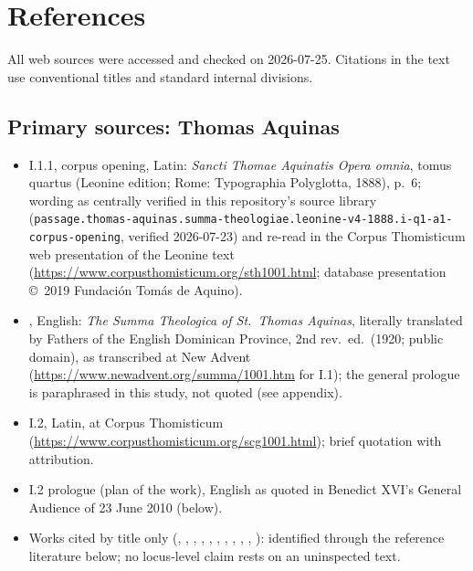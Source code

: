 \section{References}

\begingroup
\raggedright
\expandafter\def\expandafter\UrlBreaks\expandafter{\UrlBreaks\do\-}

All web sources were accessed and checked on 2026-07-25. Citations in the
text use conventional titles and standard internal divisions.

\subsection*{Primary sources: Thomas Aquinas}

\begin{itemize}
\item {} I.1.1, corpus opening, Latin: \textit{Sancti
Thomae Aquinatis Opera omnia}, tomus quartus (Leonine edition; Rome:
Typographia Polyglotta, 1888), p.~6; wording as centrally verified in this
repository's source library
(\texttt{passage.thomas-aquinas.summa-theologiae.leonine-v4-1888.i-q1-a1-corpus-opening},
verified 2026-07-23) and re-read in the Corpus Thomisticum web
presentation of the Leonine text
(\url{https://www.corpusthomisticum.org/sth1001.html}; database
presentation \copyright~2019 Fundaci\'on Tom\'as de Aquino).
\item {}, English: \textit{The Summa Theologica of
St.\ Thomas Aquinas}, literally translated by Fathers of the English
Dominican Province, 2nd rev.\ ed.\ (1920; public domain), as transcribed
at New Advent (\url{https://www.newadvent.org/summa/1001.htm} for I.1);
the general prologue is paraphrased in this study, not quoted (see
appendix).
\item {} I.2, Latin, at Corpus Thomisticum
(\url{https://www.corpusthomisticum.org/scg1001.html}); brief quotation
with attribution.
\item {} I.2 prologue (plan of the work), English as
quoted in Benedict XVI's General Audience of 23 June 2010 (below).
\item Works cited by title only (,
, , , , ,
, , ,
, ):
identified through the reference literature below; no locus-level claim
rests on an uninspected text.
\end{itemize}

